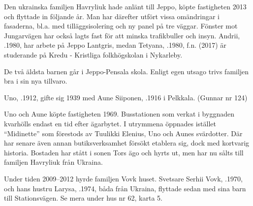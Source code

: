 

Den ukrainska familjen Havryliuk hade anlänt till Jeppo, köpte fastigheten 2013 och flyttade in följande år. Man har därefter utfört vissa omändringar i fasaderna, bl.a. med tilläggsisolering och ny panel på tre väggar. Fönster mot Jungarvägen har också lagts fast för att minska trafikbuller och insyn. Andrii, .1980, har arbete på Jeppo Lantgris, medan Tetyana, .1980, f.n. (2017) är studerande på Kredu - Kristliga folkhögskolan i Nykarleby.
\begin{jhchildren}
  \item {}
  \item {}
  \item {}
\end{jhchildren}
De två äldsta barnen går i Jeppo-Pensala skola. Enligt egen utsago trivs familjen bra i sin nya tillvaro.


Uno, .1912, gifte sig 1939 med Aune Siiponen, .1916 i Pelkkala. (Gunnar nr 124)
\begin{jhchildren}
  \item {}
  \item {}
  \item {}
  \item {}
\end{jhchildren}
Uno och Aune köpte fastigheten 1969. Busstationen som verkat i byggnaden kvarhölls endast en tid efter ägarbytet. I utrymmena öppnades istället  ``Midinette'' som förestods av Tuulikki Elenius, Uno och Aunes svärdotter. Där har senare även annan butiksverksamhet försökt etablera sig, dock med kortvarig historia. Bostaden har stått i sonen Tors ägo och hyrts ut, men har nu sålts till familjen Havryliuk från Ukraina.

Under tiden 2009--2012 hyrde familjen Vovk huset. Svetsare Serhii Vovk, .1970, och hans hustru Larysa, .1974, båda från Ukraina, flyttade sedan med sina barn till Stationsvägen. Se mera under hus nr 62, karta 5.

